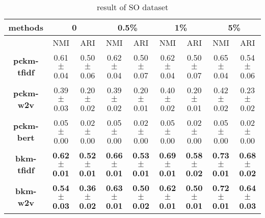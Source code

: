\begin{table}[htbp]
\caption{result of SO dataset}
\begin{center}
\begin{tabular}{c |c|c |c|c |c|c |c|c}
\hline
\textbf{methods}
	&\multicolumn{2}{|c}{0}
	&\multicolumn{2}{|c}{0.5\%}
	&\multicolumn{2}{|c}{1\%}
	&\multicolumn{2}{|c}{5\%}
	\\\hline
& NMI&ARI & NMI&ARI & NMI&ARI & NMI&ARI \\\hline
\textbf{pckm-tfidf}
	&0.61$\pm$0.04		&0.50$\pm$0.06
	&0.62$\pm$0.04		&0.50$\pm$0.07
	&0.62$\pm$0.04		&0.50$\pm$0.07
	&0.65$\pm$0.04		&0.54$\pm$0.06
	\\\hline
\textbf{pckm-w2v}
	&0.39$\pm$0.03		&0.20$\pm$0.02
	&0.39$\pm$0.02		&0.20$\pm$0.01
	&0.40$\pm$0.02		&0.20$\pm$0.01
	&0.42$\pm$0.02		&0.23$\pm$0.02
	\\\hline
\textbf{pckm-bert}
	&0.05$\pm$0.00		&0.02$\pm$0.00
	&0.05$\pm$0.00		&0.02$\pm$0.00
	&0.05$\pm$0.00		&0.02$\pm$0.00
	&0.05$\pm$0.00		&0.02$\pm$0.00
	\\\hline
\textbf{bkm-tfidf}
	&\textbf{0.62$\pm$0.01}		&\textbf{0.52$\pm$0.01}
	&\textbf{0.66$\pm$0.01}		&\textbf{0.53$\pm$0.01}
	&\textbf{0.69$\pm$0.01}		&\textbf{0.58$\pm$0.02}
	&\textbf{0.73$\pm$0.01}		&\textbf{0.68$\pm$0.02}
	\\\hline
\textbf{bkm-w2v}
	&\textbf{0.54$\pm$0.03}		&\textbf{0.36$\pm$0.02}
	&\textbf{0.63$\pm$0.01}		&\textbf{0.50$\pm$0.02}
	&\textbf{0.62$\pm$0.01}		&\textbf{0.50$\pm$0.01}
	&\textbf{0.72$\pm$0.01}		&\textbf{0.64$\pm$0.03}
	\\\hline
\end{tabular}
\label{tb:res-so}
\end{center}
\end{table}





